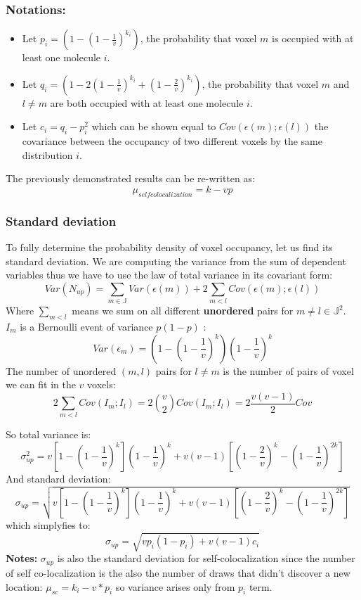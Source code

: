 \documentclass{article}
\begin{document}
\subsubsection*{Notations:}
\begin{itemize}
    \item Let $p_i = (1-{(1-\frac{1}{v})}^{k_i})$, the probability that voxel $m$ is occupied with at least one molecule $i$.
    \item Let $q_i = (1-2{(1-\frac{1}{v})}^{k_i} + {(1-\frac{2}{v})}^{k_i})$, the probability that voxel $m$ and $l\neq m$ are both occupied with at least
    one molecule $i$.
    \item Let $c_i = q_i - p_i^2$ which can be shown equal to $Cov(\epsilon(m);\epsilon(l))$ the covariance between the occupancy of two different voxels by the same distribution $i$.
\end{itemize}

The previously demonstrated results can be re-written as:
\[
\mu_{self colocalization} = k - vp
\]


\subsubsection{Standard deviation}
To fully determine the probability density of voxel occupancy, let us find its standard deviation. We are computing the variance from the sum of dependent variables
thus we have to use the law of total variance in its covariant form:
\[
Var(N_{up}) = \sum_{m \in \mathbb{J}} Var(\epsilon(m)) +  2\sum_{m < l }Cov(\epsilon(m);\epsilon(l))
\]
Where $\sum_{m<l}$ means we sum on all different \textbf{unordered} pairs for $m \neq l \in \mathbb{J}^2$.\newline
$I_m$ is a Bernoulli event of variance $p(1-p)$ :
\[
Var(\epsilon_m) = (1-(1-\frac{1}{v})^k)(1-\frac{1}{v})^k
\]
The number of unordered $(m,l)$ pairs for $l \neq m$ is the number of pairs of voxel we can fit in the $v$ voxels: 
\[
    2\sum_{m < l }Cov(I_m;I_l) = 2\binom{v}{2}Cov(I_m;I_l) = 2\frac{v(v-1)}{2}Cov 
\]

So total variance is:
\[
    \sigma^2_{up} = v[1-{(1-\frac{1}{v})}^k]{(1-\frac{1}{v})}^k + v(v-1)[(1-\frac{2}{v})^k - (1-\frac{1}{v})^{2k}]
\]
And standard deviation:
\[
    \sigma_{up} = \sqrt{v[1-{(1-\frac{1}{v})}^k]{(1-\frac{1}{v})}^k + v(v-1)[(1-\frac{2}{v})^k - (1-\frac{1}{v})^{2k}]}
\]
which simplyfies to:
\begin{equation}
    \sigma_{up} = \sqrt{vp_i(1-p_i) + v(v-1)c_i}
\end{equation}
\textbf{Notes:} $\sigma_{up}$ is also the standard deviation for self-colocalization since the number of self co-localization is the also the number
of draws that didn't discover a new location: $\mu_{sc} = k_i - v*p_i$ so variance arises only from $p_i$ term.
\end{document}
